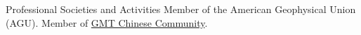 \begin{rubric}{Professional Societies and Activities}
\entry*[2017 -- present] Member of the American Geophysical Union (AGU).
\entry*[2016 -- present] Member of \href{http://gmt-china.org/}{GMT Chinese Community}.
\end{rubric}
